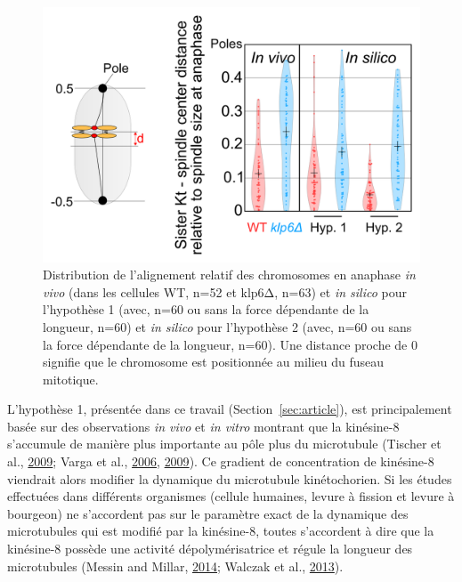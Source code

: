 \documentclass[12pt,a4paper,twoside,openright]{book}
\begin{document}
\begin{figure}[htbp]
\centering
\includegraphics{figures/results/modelling/ch_alignment.png}
\caption[Distribution de l'alignement relatif des chromosomes en anaphase]{\label{fig:ch-alignment}Distribution
de l'alignement relatif des chromosomes en anaphase \emph{in vivo} (dans
les cellules WT, n=52 et klp6Δ, n=63) et \emph{in silico} pour
l'hypothèse 1 (avec, n=60 ou sans la force dépendante de la longueur,
n=60) et \emph{in silico} pour l'hypothèse 2 (avec, n=60 ou sans la
force dépendante de la longueur, n=60). Une distance proche de 0
signifie que le chromosome est positionnée au milieu du fuseau
mitotique.}
\end{figure}

L'hypothèse 1, présentée dans ce travail (Section~\ref{sec:article}),
est principalement basée sur des observations \emph{in vivo} et \emph{in
vitro} montrant que la kinésine-8 s'accumule de manière plus importante
au pôle plus du microtubule (Tischer et al.,
\protect\hyperlink{ref-Tischer2009}{2009}; Varga et al.,
\protect\hyperlink{ref-Varga2006}{2006},
\protect\hyperlink{ref-Varga2009}{2009}). Ce gradient de concentration
de kinésine-8 viendrait alors modifier la dynamique du microtubule
kinétochorien. Si les études effectuées dans différents organismes
(cellule humaines, levure à fission et levure à bourgeon) ne s'accordent
pas sur le paramètre exact de la dynamique des microtubules qui est
modifié par la kinésine-8, toutes s'accordent à dire que la kinésine-8
possède une activité dépolymérisatrice et régule la longueur des
microtubules (Messin and Millar,
\protect\hyperlink{ref-Messin2014}{2014}; Walczak et al.,
\protect\hyperlink{ref-Walczak2013a}{2013}).
\end{document}
